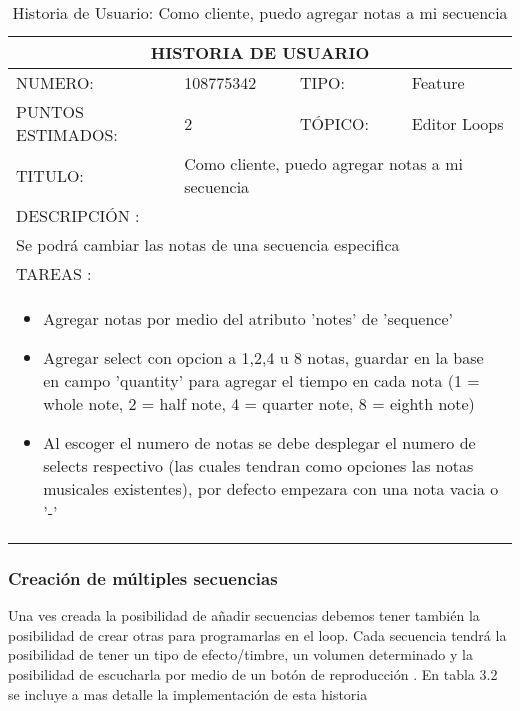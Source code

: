 \begin{table}[h]
\centering
\renewcommand{\arraystretch}{1.4}
\begin{tabular}{|*{4}{l|}}
\hline
\multicolumn{4}{|c|}{HISTORIA DE USUARIO} \\ \hline
NUMERO: & 108775342 & TIPO: & Feature \\ \hline
PUNTOS ESTIMADOS: & 2 & TÓPICO: & Editor Loops \\ \hline
TITULO: & \multicolumn{3}{|p{7.2cm}|}{Como cliente, puedo agregar notas a mi secuencia} \\ \hline
\multicolumn{4}{|l|}{DESCRIPCIÓN : } \\ \hline
\multicolumn{4}{|l|}{Se podrá cambiar las notas de una secuencia especifica} \\ \hline
\multicolumn{4}{|l|}{TAREAS : } \\ \hline
\multicolumn{4}{|p{11cm}|}{
\begin{minipage}[t]{\hsize}
  \begin{itemize}
    \item Agregar notas por medio del atributo 'notes' de 'sequence'
    \item Agregar select con opcion a 1,2,4 u 8 notas, guardar en la base en campo 'quantity' para agregar el tiempo en cada nota (1 = whole note, 2 = half note, 4 = quarter note, 8 = eighth note)
    \item Al escoger el numero de notas se debe desplegar el numero de selects respectivo (las cuales tendran como opciones las notas musicales existentes), por defecto empezara con una nota vacia o '-'
  \end{itemize}
\end{minipage}
} \\ \hline
\end{tabular}
\caption{Historia de Usuario: Como cliente, puedo agregar notas a mi secuencia}
\label{tab:Primero}
\end{table}

\subsubsection{Creación de múltiples secuencias}

Una ves creada la posibilidad de añadir secuencias debemos tener también la posibilidad
de crear otras para programarlas en el loop. Cada secuencia tendrá la posibilidad
de tener un tipo de efecto/timbre, un volumen determinado y la posibilidad de
escucharla por medio de un botón de reproducción
. En tabla 3.2 se incluye a mas detalle la implementación de
esta historia


